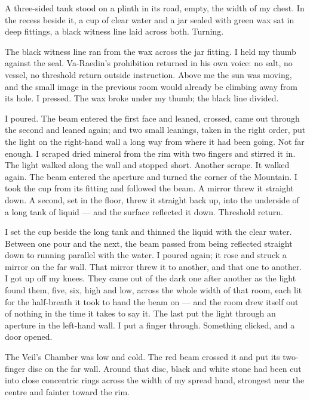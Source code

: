 A three-sided tank stood on a plinth in its road, empty, the width of my chest. In the recess beside it, a cup of clear water and a jar sealed with green wax sat in deep fittings, a black witness line laid across both. Turning.\par

The black witness line ran from the wax across the jar fitting. I held my thumb against the seal. Va-Raedin's prohibition returned in his own voice: no salt, no vessel, no threshold return outside instruction. Above me the sun was moving, and the small image in the previous room would already be climbing away from its hole. I pressed. The wax broke under my thumb; the black line divided.\par

I poured. The beam entered the first face and leaned, crossed, came out through the second and leaned again; and two small leanings, taken in the right order, put the light on the right-hand wall a long way from where it had been going. Not far enough. I scraped dried mineral from the rim with two fingers and stirred it in. The light walked along the wall and stopped short. Another scrape. It walked again. The beam entered the aperture and turned the corner of the Mountain. I took the cup from its fitting and followed the beam. A mirror threw it straight down. A second, set in the floor, threw it straight back up, into the underside of a long tank of liquid --- and the surface reflected it down. Threshold return.\par

I set the cup beside the long tank and thinned the liquid with the clear water. Between one pour and the next, the beam passed from being reflected straight down to running parallel with the water. I poured again; it rose and struck a mirror on the far wall. That mirror threw it to another, and that one to another. I got up off my knees. They came out of the dark one after another as the light found them, five, six, high and low, across the whole width of that room, each lit for the half-breath it took to hand the beam on --- and the room drew itself out of nothing in the time it takes to say it. The last put the light through an aperture in the left-hand wall. I put a finger through. Something clicked, and a door opened.\par

\ornament

The Veil's Chamber was low and cold. The red beam crossed it and put its two-finger disc on the far wall. Around that disc, black and white stone had been cut into close concentric rings across the width of my spread hand, strongest near the centre and fainter toward the rim.\par

